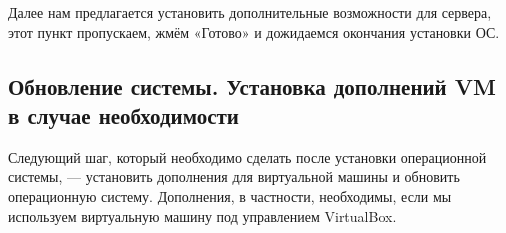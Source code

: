\documentclass[14pt, a4paper]{article}
\begin{document}
Далее нам предлагается установить дополнительные возможности для сервера, этот пункт
пропускаем, жмём «Готово» и дожидаемся окончания установки ОС.
\begin{figure}[H]%
    \centering
    \label{1.14} %
\end{figure}


\subsection*{Обновление системы. Установка дополнений VM в случае необходимости}
Следующий шаг, который необходимо сделать после установки операционной системы, —
установить дополнения для виртуальной машины и обновить операционную систему. Дополнения, в
частности, необходимы, если мы используем виртуальную машину под управлением VirtualBox.
\end{document}

